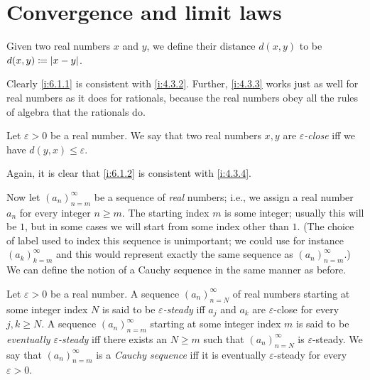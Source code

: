 \section{Convergence and limit laws}\label{i:sec:6.1}

\begin{defn}\label{i:6.1.1}
  Given two real numbers \(x\) and \(y\), we define their distance \(d(x, y)\) to be \(d(x, y) \coloneqq \left\lvert x - y\right\rvert\).
\end{defn}

\begin{note}
  Clearly \cref{i:6.1.1} is consistent with \cref{i:4.3.2}.
  Further, \cref{i:4.3.3} works just as well for real numbers as it does for rationals, because the real numbers obey all the rules of algebra that the rationals do.
\end{note}

\begin{defn}\label{i:6.1.2}
  Let \(\varepsilon > 0\) be a real number.
  We say that two real numbers \(x, y\) are \emph{\(\varepsilon\)-close} iff we have \(d(y, x) \leq \varepsilon\).
\end{defn}

\begin{note}
  Again, it is clear that \cref{i:6.1.2} is consistent with \cref{i:4.3.4}.
\end{note}

\begin{note}
  Now let \((a_n)_{n = m}^\infty\) be a sequence of \emph{real} numbers;
  i.e., we assign a real number \(a_n\) for every integer \(n \geq m\).
  The starting index \(m\) is some integer;
  usually this will be \(1\), but in some cases we will start from some index other than \(1\).
  (The choice of label used to index this sequence is unimportant; we could use for instance \((a_k)_{k = m}^{\infty}\) and this would represent exactly the same sequence as \((a_n)_{n = m}^{\infty}\).)
  We can define the notion of a Cauchy sequence in the same manner as before.
\end{note}

\begin{defn}\label{i:6.1.3}
  Let \(\varepsilon > 0\) be a real number.
  A sequence \((a_n)_{n = N}^\infty\) of real numbers starting at some integer index \(N\) is said to be \emph{\(\varepsilon\)-steady} iff \(a_j\) and \(a_k\) are \(\varepsilon\)-close for every \(j, k \geq N\).
  A sequence \((a_n)_{n = m}^\infty\) starting at some integer index \(m\) is said to be \emph{eventually \(\varepsilon\)-steady} iff there exists an \(N \geq m\) such that \((a_n)_{n = N}^\infty\) is \(\varepsilon\)-steady.
  We say that \((a_n)_{n = m}^\infty\) is a \emph{Cauchy sequence} iff it is eventually \(\varepsilon\)-steady for every \(\varepsilon > 0\).
\end{defn}

